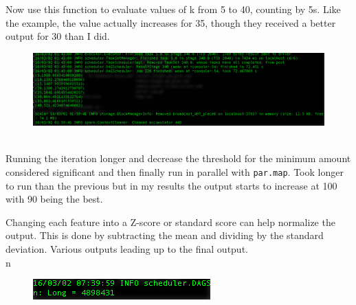 \documentclass[10pt]{article}
\begin{document}
\indent Now use this function to evaluate values of k from 5 to 40, counting by 5s. Like the example, the value actually increases for 35, though they received a better output for 30 than I did. 
\begin{figure}[!h]
\includegraphics[scale=0.37]{evaluateK.png}
\centering
\end{figure}\\
\indent Running the iteration longer and decrease the threshold for the minimum amount considered significant and then finally run in parallel with \verb|par.map|. Took longer to run than the previous but in my results the output starts to increase at 100 with 90 being the best.
\par
{}%
\hfill
{}%
\par
Changing each feature into a Z-score or standard score can help normalize the output. This is done by subtracting the mean and dividing by the standard deviation. Various outputs leading up to the final output.\\
n
\begin{figure}[!h]
\includegraphics[scale=0.43]{n.png}
\centering
\end{figure}\\
\end{document}
